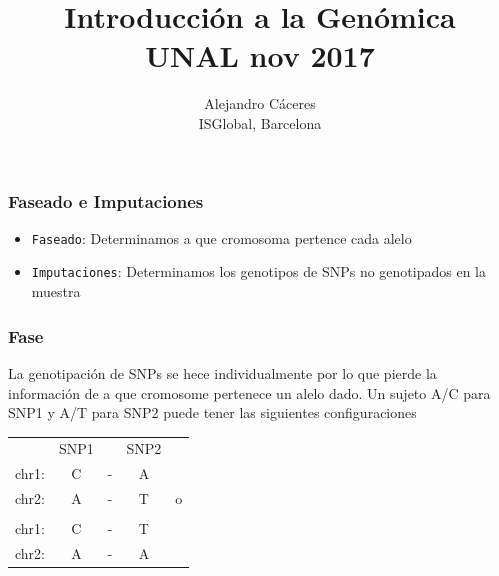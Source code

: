 \documentclass{beamer}\usepackage[]{graphicx}\usepackage[]{color}
\begin{document}
\title{Introducci\'on a la Gen\'omica \\ UNAL nov 2017}
\author{Alejandro C\'aceres \\ ISGlobal, Barcelona}


\maketitle


\begin{frame}[fragile]
\frametitle{Faseado e Imputaciones}

\begin{itemize}

\item {\tt Faseado}: Determinamos a que cromosoma pertence cada alelo 

\item {\tt Imputaciones}: Determinamos los genotipos de SNPs no genotipados en la muestra 

\end{itemize}
\end{frame}


\begin{frame}[fragile]
\frametitle{Fase}
La genotipaci\'on de SNPs se hece individualmente por lo que pierde la informaci\'on de
a que cromosome pertenece un alelo dado. Un sujeto A/C para SNP1 y A/T para SNP2 puede tener las siguientes configuraciones  

\begin{table}[]
\centering
\begin{tabular}{ccccc}
      &SNP1& &SNP2 & \\ 
chr1: &C   &-&  A& \\
chr2: &A   &-&  T& o \\
& & & &\\
chr1: &C   &-&  T& \\
chr2: &A   &-&  A&  \\
\end{tabular}

\end{table}
\end{frame}
\end{document}
